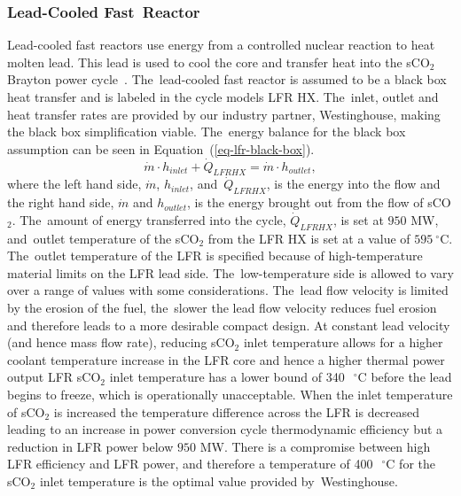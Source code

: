 \documentclass[sustainability,article,accept,moreauthors,pdftex]{Definitions/mdpi}
\begin{document}
\begin{paracol}{2}
    \switchcolumn


\vspace{-6pt}
\subsubsection{Lead-Cooled Fast~Reactor}
Lead-cooled fast reactors use energy from a controlled nuclear reaction to heat molten lead. This lead is used to cool the core and transfer heat into the sCO$_2$ Brayton power cycle~\cite{smith_2016_lfr_background,alemberti_2013_lfr_overview}. The~lead-cooled fast reactor is assumed to be a black box heat transfer and is labeled in the cycle models LFR HX. The~inlet, outlet and heat transfer rates are provided by our industry partner, Westinghouse, making the black box simplification viable. The~energy balance for the black box assumption can be seen in Equation~(\ref{eq-lfr-black-box}).
\begin{equation}
    \label{eq-lfr-black-box}
    \dot{m} \cdot h_{inlet} + \dot{Q}_{LFRHX} = \dot{m} \cdot h_{outlet},
\end{equation}
where the left hand side, $\dot{m}$, $h_{inlet}$, and~$\dot{Q}_{LFRHX}$, is the energy into the flow and the right hand side, $\dot{m}$ and $h_{outlet}$, is the energy brought out from the flow of sCO$_2$. The~amount of energy transferred into the cycle, $\dot{Q}_{LFRHX}$, is set at $950$ MW, and~outlet temperature of the sCO$_2$ from the LFR HX is set at a value of $595~^{\circ}$C. The~outlet temperature of the LFR is specified because of high-temperature material limits on the LFR lead side. The~low-temperature side is allowed to vary over a range of values with some considerations. The~lead flow velocity is limited by the erosion of the fuel, the~slower the lead flow velocity reduces fuel erosion and therefore leads to a more desirable compact design. %
{At constant lead velocity (and hence mass flow rate), reducing sCO$_2$ inlet temperature allows for a higher coolant temperature increase in the LFR core and hence a higher thermal power output}
LFR sCO$_2$ inlet temperature has a lower bound of 340~$~^{\circ}$C before the lead begins to freeze, which is operationally unacceptable. When the inlet temperature of sCO$_2$ is increased the temperature difference across the LFR is decreased leading to an increase in power conversion cycle thermodynamic efficiency but a reduction in LFR power below $950$ MW. There is a compromise between high LFR efficiency and LFR power, and therefore a temperature of 400~$~^{\circ}$C for the sCO$_2$ inlet temperature is the optimal value provided by~Westinghouse.



\end{paracol}
\end{document}
